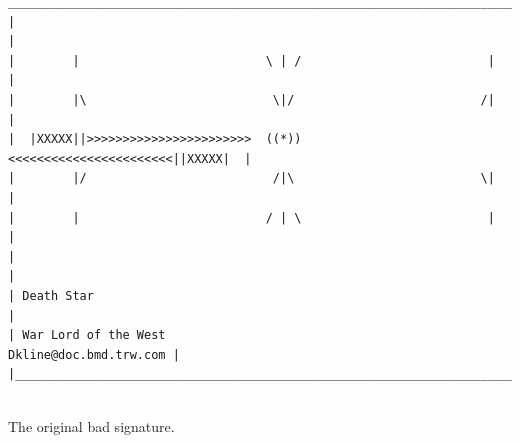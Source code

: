 \documentclass[a4paper,landscape,headrule,footrule,xetex]{foils}
\begin{document}
\begin{flushleft}
  \begin{footnotesize}
\begin{verbatim}
__________________________________________________________________________
|                                                                           |
|        |                          \ | /                          |        |
|        |\                          \|/                          /|        |
|  |XXXXX||>>>>>>>>>>>>>>>>>>>>>>>  ((*))  <<<<<<<<<<<<<<<<<<<<<<<||XXXXX|  |
|        |/                          /|\                          \|        |
|        |                          / | \                          |        |
|                                                                           |
| Death Star                                                                |
| War Lord of the West                               Dkline@doc.bmd.trw.com |
|___________________________________________________________________________|
 
\end{verbatim}
  \end{footnotesize}
\end{flushleft}

The original bad signature.
\end{document}
